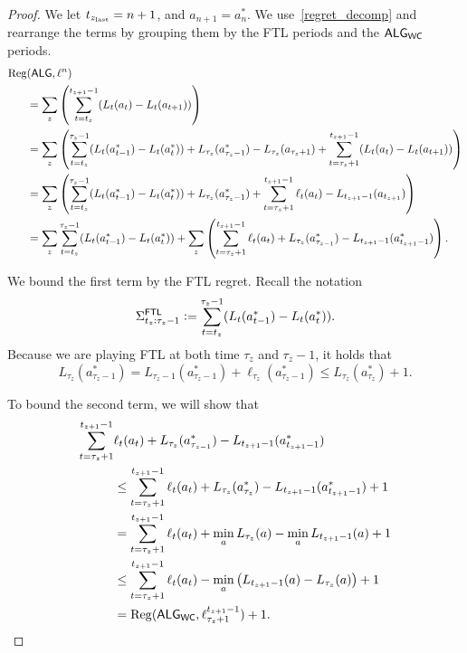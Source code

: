 \begin{proof}
We let $t_{z_{\mathrm{last}}} = n+1$, and $a_{n+1} = a_n^*$. We use~\cref{regret_decomp} and rearrange the terms by grouping them by the FTL periods and the $\mathsf{ALG}_{\mathsf{WC}}$ periods.
\begin{align}
\mathrm{Reg}&(\mathsf{ALG}, \ell^n) \nonumber\\
&= \sum_z \left( \sum_{t=t_z}^{t_{z+1}-1} (L_t(a_t) - L_t(a_{t+1})) \right) \nonumber\\
&= \sum_z \left( \sum_{t=t_z}^{\tau_z-1} (L_t(a_{t-1}^*) - L_t(a_{t}^*))
+ L_{\tau_z}(a_{\tau_z-1}^*) - L_{\tau_z}(a_{\tau_z+1}) + \sum_{t=\tau_z+1}^{t_{z+1}-1} (L_t(a_t) - L_t(a_{t+1})) \right) \nonumber\\
&= \sum_z \left( \sum_{t=t_z}^{\tau_z-1} (L_t(a_{t-1}^*) - L_t(a_t^*)) + L_{\tau_z}(a_{\tau_z-1}^*) + \sum_{t=\tau_z+1}^{t_{z+1}-1} \ell_t(a_t) - L_{t_{z+1}-1}(a_{t_{z+1}}) \right) \nonumber\\
&= \sum_z \sum_{t=t_z}^{\tau_z-1} (L_t(a_{t-1}^*) - L_t(a_{t}^*)) + \sum_z \left(\sum_{t=\tau_z+1}^{t_{z+1}-1} \ell_t(a_t) + L_{\tau_z}(a_{\tau_{z-1}}^*) - L_{t_{z+1}-1}(a_{t_{z+1}-1}^*) \right). \nonumber
\end{align}

We bound the first term by the FTL regret. Recall the notation
\begin{align}
\Sigma^{\mathsf{FTL}}_{t_z:\tau_z-1} := \sum_{t=t_z}^{\tau_z-1} (L_t(a_{t-1}^*) - L_t(a_{t}^*)).
\end{align}
Because we are playing FTL at both time $\tau_z$ and $\tau_z - 1$, it holds that 
\[L_{\tau_z}(a_{\tau_{z}-1}^*) = L_{\tau_z-1}(a_{\tau_{z}-1}^*) + \ell_{\tau_z}(a_{\tau_{z}-1}^*) \leq L_{\tau_z}(a_{\tau_{z}}^*) + 1.\]

To bound the second term, we will show that 
\begin{align}
\sum_{t=\tau_z+1}^{t_{z+1}-1} &\ell_t(a_t) + L_{\tau_z}(a_{\tau_{z-1}}^*) - L_{t_{z+1}-1}(a_{t_{z+1}-1}^*) 
\nonumber\\
&\leq \sum_{t=\tau_z+1}^{t_{z+1}-1} \ell_t(a_t) + L_{\tau_z}(a_{\tau_{z}}^*) - L_{t_{z+1}-1}(a_{t_{z+1}-1}^*) + 1 \\ 
&= \sum_{t=\tau_z+1}^{t_{z+1}-1} \ell_t(a_t) + \min_a L_{\tau_z}(a)  - \min_a L_{t_{z+1}-1}(a) +1\\ 
&\leq \sum_{t=\tau_z+1}^{t_{z+1}-1} \ell_t(a_t) - \min_a \left(L_{t_{z+1}-1}(a) - L_{\tau_z}(a)\right) + 1 \\
&= \mathrm{Reg}(\mathsf{ALG}_{\mathsf{WC}}, \ell_{\tau_z+1}^{t_{z+1}-1}) +1. 
\end{align}
\end{proof}


